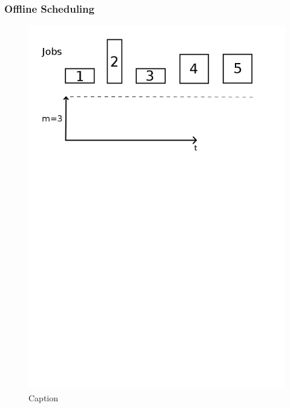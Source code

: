 \documentclass{beamer}
\begin{document}
\begin{frame}
  \frametitle{Offline Scheduling}
  \begin{figure}[H]
          \centering
          \includegraphics[width=\textwidth]{offline.png}
          \caption{Caption}
          \label{fig:offline_png}
  \end{figure}

\end{frame}
\end{document}
